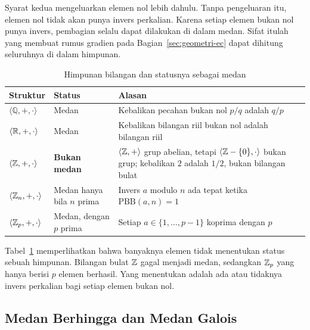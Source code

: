 Syarat kedua mengeluarkan elemen nol lebih dahulu. Tanpa pengeluaran itu,
elemen nol tidak akan punya invers perkalian. Karena setiap elemen bukan nol
punya invers, pembagian selalu dapat dilakukan di dalam medan. Sifat itulah
yang membuat rumus gradien pada Bagian~\ref{sec:geometri-ec} dapat dihitung
seluruhnya di dalam himpunan.

\begin{table}[htbp]
    \centering
    \caption{Himpunan bilangan dan statusnya sebagai medan}
    \label{tab:contoh-medan}
    \begin{tabularx}{\linewidth}{@{}l l
                                   >{\raggedright\arraybackslash}X@{}}
    \toprule
    \textbf{Struktur} & \textbf{Status} & \textbf{Alasan} \\
    \midrule
    $\langle \mathbb{Q}, +, \cdot \rangle$ & Medan &
    Kebalikan pecahan bukan nol $p/q$ adalah $q/p$ \\
    \addlinespace
    $\langle \mathbb{R}, +, \cdot \rangle$ & Medan &
    Kebalikan bilangan riil bukan nol adalah bilangan riil \\
    \addlinespace
    $\langle \mathbb{Z}, +, \cdot \rangle$ & \textbf{Bukan medan} &
    $\langle \mathbb{Z}, + \rangle$ grup abelian, tetapi $\langle \mathbb{Z} - \{0\}, \cdot
    \rangle$ bukan grup; kebalikan $2$ adalah $1/2$, bukan bilangan bulat \\
    \addlinespace
    $\langle \mathbb{Z}_n, +, \cdot \rangle$ & Medan hanya bila $n$ prima &
    Invers $a$ modulo $n$ ada tepat ketika $\text{PBB}(a, n) = 1$ \\
    \addlinespace
    $\langle \mathbb{Z}_p, +, \cdot \rangle$ & Medan, dengan $p$ prima &
    Setiap $a \in \{1, \dots, p-1\}$ koprima dengan $p$ \\
    \bottomrule
    \end{tabularx}
\end{table}


Tabel~\ref{tab:contoh-medan} memperlihatkan bahwa banyaknya elemen tidak
menentukan status sebuah himpunan. Bilangan bulat $\mathbb{Z}$ gagal menjadi medan,
sedangkan $\mathbb{Z}_p$ yang hanya berisi $p$ elemen berhasil. Yang menentukan adalah
ada atau tidaknya invers perkalian bagi setiap elemen bukan nol.

\subsection{Medan Berhingga dan Medan Galois}
\label{subsec:medan-berhingga}

